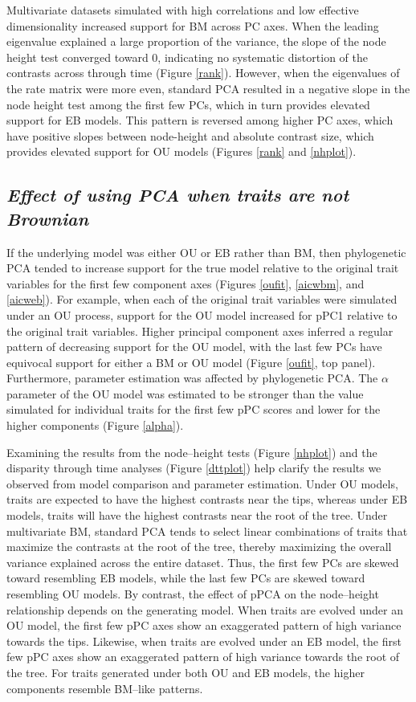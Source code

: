 \documentclass[a4paper,12pt]{article}
\begin{document}
Multivariate datasets simulated with high correlations and low effective dimensionality increased support for BM across PC axes. When the leading eigenvalue explained a large proportion of the variance, the slope of the node height test converged toward 0, indicating no systematic distortion of the contrasts across through time (Figure \ref{rank}). However, when the eigenvalues of the rate matrix were more even, standard PCA resulted in a negative slope in the node height test among the first few PCs, which in turn provides elevated support for EB models. This pattern is reversed among higher PC axes, which have positive slopes between node-height and absolute contrast size, which provides elevated support for OU models (Figures \ref{rank} and \ref{nhplot}). 

\subsection{\emph{Effect of using PCA when traits are not Brownian}}
If the underlying model was either OU or EB rather than BM, then phylogenetic PCA tended to increase support for the true model relative to the original trait variables for the first few component axes (Figures \ref{oufit}, \ref{aicwbm}, and \ref{aicweb}). For example, when each of the original trait variables were simulated under an OU process, support for the OU model increased for pPC1 relative to the original trait variables. Higher principal component axes inferred a regular pattern of decreasing support for the OU model, with the last few PCs have equivocal support for either a BM or OU model (Figure \ref{oufit}, top panel). Furthermore, parameter estimation was affected by phylogenetic PCA. The $\alpha$ parameter of the OU model was estimated to be stronger than the value simulated for individual traits for the first few pPC scores and lower for the higher components (Figure \ref{alpha}). 

Examining the results from the node--height tests (Figure \ref{nhplot}) and the disparity through time analyses (Figure \ref{dttplot}) help clarify the results we observed from model comparison and parameter estimation. 
Under OU models, traits are expected to have the highest contrasts near the tips, whereas under EB models, traits will have the highest contrasts near the root of the tree. Under multivariate BM, standard PCA tends to select linear combinations of traits that maximize the contrasts at the root of the tree, thereby maximizing the overall variance explained across the entire dataset. Thus, the first few PCs are skewed toward resembling EB models, while the last few PCs are skewed toward resembling OU models. By contrast, the effect of pPCA on the node--height relationship depends on the generating model. When traits are evolved under an OU model, the first few pPC axes show an exaggerated pattern of high variance towards the tips. Likewise, when traits are evolved under an EB model, the first few pPC axes show an exaggerated pattern of high variance towards the root of the tree. For traits generated under both OU and EB models, the higher components resemble BM--like patterns. 
\end{document}
